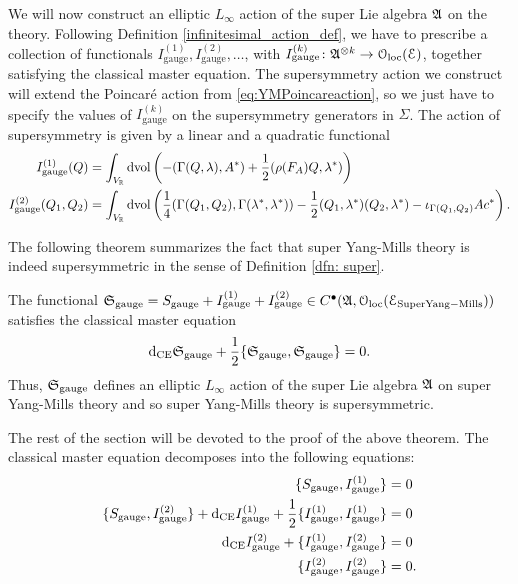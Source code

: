 \documentclass[10pt, oneside]{article}
\newcommand{\gauge}{\mathrm{gauge}}
\begin{document}
We will now construct an elliptic $L_\infty$ action of the super Lie algebra $\mathfrak{A}$ on the theory. 
Following Definition \ref{infinitesimal_action_def}, we have to prescribe a collection of functionals $I_{\gauge}^{(1)}, I_{\gauge}^{(2)}, \dots$, with $I_{\gauge}^{(k)}\colon \mf{A}^{\otimes k}\rightarrow \oloc(\cE)$, together satisfying the classical master equation. The supersymmetry action we construct will extend the Poincar\'{e} action from \eqref{eq:YMPoincareaction}, so we just have to specify the values of $I_{\gauge}^{(k)}$ on the supersymmetry generators in $\Sigma$. The action of supersymmetry is given by a linear and a quadratic functional
\begin{align*}
I_{\gauge}^{(1)}(Q) &= \int_{V_\RR}\dvol\left( -(\Gamma(Q, \lambda), A^*) + \frac{1}{2}(\rho(F_A)Q, \lambda^*)\right) \\
I_{\gauge}^{(2)}(Q_1, Q_2) &= \int_{V_\RR}\dvol\left( \frac{1}{4}(\Gamma(Q_1, Q_2), \Gamma(\lambda^*, \lambda^*)) - \frac{1}{2}(Q_1, \lambda^*)(Q_2, \lambda^*) - \iota_{\Gamma(Q_1, Q_2)} A c^*\right).
\end{align*}

The following theorem summarizes the fact that super Yang-Mills theory is indeed supersymmetric in the sense of Definition \ref{dfn: super}. 

\begin{thm}\label{thm:gaugemultipletSUSY}
The functional $\fS_{\gauge} = S_{\gauge} + I_{\gauge}^{(1)} + I_{\gauge}^{(2)} \in C^\bu(\mf{A}, \oloc(\cE_{\rm Super Yang-Mills}))$ satisfies the classical master equation
\[\d_{\mr{CE}} \fS_{\gauge} + \frac{1}{2}\{\fS_{\gauge}, \fS_{\gauge}\} = 0.\]
Thus, $\fS_{\gauge}$ defines an elliptic $L_\infty$ action of the super Lie algebra $\mathfrak A$ on super Yang-Mills theory and so super Yang-Mills theory is supersymmetric.  
\end{thm}

The rest of the section will be devoted to the proof of the above theorem. The classical master equation decomposes into the following equations:
\begin{align*}
\{S_{\gauge}, I_{\gauge}^{(1)}\} &= 0 \\
\{S_{\gauge}, I_{\gauge}^{(2)}\} + \d_{\mr{CE}} I_{\gauge}^{(1)} + \frac{1}{2}\{I_{\gauge}^{(1)}, I_{\gauge}^{(1)}\} &= 0 \\
\d_{\mr{CE}} I_{\gauge}^{(2)} + \{I_{\gauge}^{(1)}, I_{\gauge}^{(2)}\} &= 0 \\
\{I_{\gauge}^{(2)}, I_{\gauge}^{(2)}\} &= 0.
\end{align*}
\end{document}
